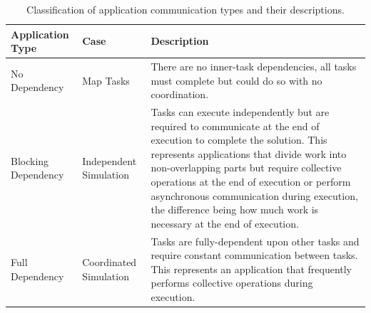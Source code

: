 \begin{table}
\footnotesize
\centering
\begin{tabular*}{\columnwidth}{p{}|p{}|p{}}
\toprule
Application Type & Case & Description \\
\midrule
No Dependency           & Map Tasks                & There are no inner-task dependencies, all tasks must complete but could do so with no coordination.\\
Blocking Dependency	& Independent Simulation   & Tasks can execute independently but are required to communicate at the end of execution to complete the solution. This represents applications that divide work into non-overlapping parts but require collective operations at the end of execution or perform asynchronous communication during execution, the difference being how much work is necessary at the end of execution. \\
Full Dependency        & Coordinated Simulation   & Tasks are fully-dependent upon other tasks and require constant communication between tasks. This represents an application that frequently performs collective operations during execution.\\
\bottomrule
\end{tabular*}
\caption{
        Classification of application communication types and their descriptions.
}
\label{tab:application_communication}
\end{table}

